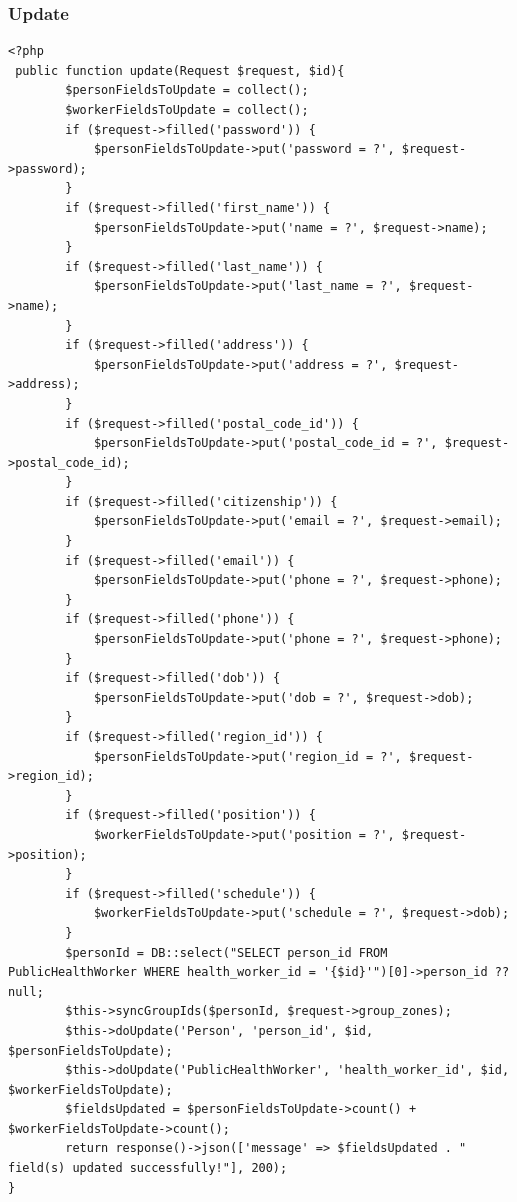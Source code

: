 \documentclass{article}
\begin{document}
\subsubsection{Update}
\begin{verbatim}
<?php
 public function update(Request $request, $id){
        $personFieldsToUpdate = collect();
        $workerFieldsToUpdate = collect();
        if ($request->filled('password')) {
            $personFieldsToUpdate->put('password = ?', $request->password);
        }
        if ($request->filled('first_name')) {
            $personFieldsToUpdate->put('name = ?', $request->name);
        }
        if ($request->filled('last_name')) {
            $personFieldsToUpdate->put('last_name = ?', $request->name);
        }
        if ($request->filled('address')) {
            $personFieldsToUpdate->put('address = ?', $request->address);
        }
        if ($request->filled('postal_code_id')) {
            $personFieldsToUpdate->put('postal_code_id = ?', $request->postal_code_id);
        }
        if ($request->filled('citizenship')) {
            $personFieldsToUpdate->put('email = ?', $request->email);
        }
        if ($request->filled('email')) {
            $personFieldsToUpdate->put('phone = ?', $request->phone);
        }
        if ($request->filled('phone')) {
            $personFieldsToUpdate->put('phone = ?', $request->phone);
        }
        if ($request->filled('dob')) {
            $personFieldsToUpdate->put('dob = ?', $request->dob);
        }
        if ($request->filled('region_id')) {
            $personFieldsToUpdate->put('region_id = ?', $request->region_id);
        }
        if ($request->filled('position')) {
            $workerFieldsToUpdate->put('position = ?', $request->position);
        }
        if ($request->filled('schedule')) {
            $workerFieldsToUpdate->put('schedule = ?', $request->dob);
        }
        $personId = DB::select("SELECT person_id FROM PublicHealthWorker WHERE health_worker_id = '{$id}'")[0]->person_id ?? null;
        $this->syncGroupIds($personId, $request->group_zones);
        $this->doUpdate('Person', 'person_id', $id, $personFieldsToUpdate);
        $this->doUpdate('PublicHealthWorker', 'health_worker_id', $id, $workerFieldsToUpdate);
        $fieldsUpdated = $personFieldsToUpdate->count() + $workerFieldsToUpdate->count();
        return response()->json(['message' => $fieldsUpdated . " field(s) updated successfully!"], 200);
}

\end{verbatim}
\end{document}
